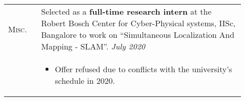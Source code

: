 \documentclass[letterpaper, 10pt, oneside]{article}
\newcommand{\stitle}[1]{\normalsize{\textsc{#1}}}
\begin{document}
\begin{longtable}{@{} p{0.13\linewidth} p{0.8\linewidth}}


    \stitle{Misc.}
                         & Selected as a \textbf{full-time research intern} at the
    Robert Bosch Center for Cyber-Physical systems, IISc, Bangalore to work on
    ``Simultaneous Localization And Mapping - SLAM''.
    \hfill \textsl{July 2020}                                                                                                                                                                                                                \\
                         & \parbox{0.8\textwidth}{                                                                                                                                                                                           %
        \begin{itemize}[leftmargin=6ex, itemsep=-0.88ex, topsep=-0.88ex]
            \item Offer refused due to conflicts with the university's schedule in 2020.
        \end{itemize}
    }
    \\[1.5ex]


\end{longtable}
\end{document}
